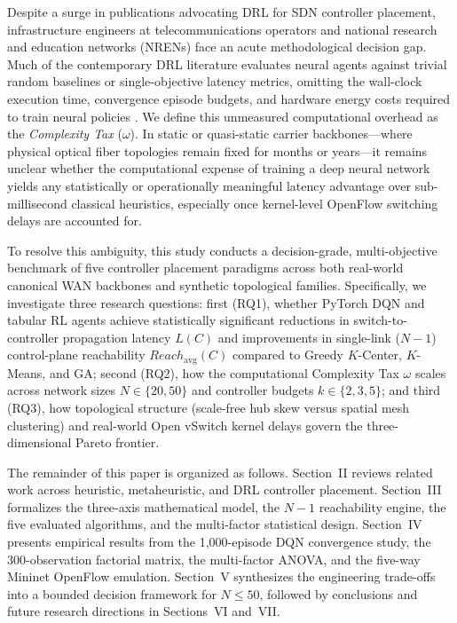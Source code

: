 \documentclass[conference]{IEEEtran}
\begin{document}
Despite a surge in publications advocating DRL for SDN controller placement, infrastructure engineers at telecommunications operators and national research and education networks (NRENs) face an acute methodological decision gap. Much of the contemporary DRL literature evaluates neural agents against trivial random baselines or single-objective latency metrics, omitting the wall-clock execution time, convergence episode budgets, and hardware energy costs required to train neural policies \cite{benoudifa2023, kurra2025, farahi2026}. We define this unmeasured computational overhead as the \textit{Complexity Tax} ($\omega$). In static or quasi-static carrier backbones---where physical optical fiber topologies remain fixed for months or years---it remains unclear whether the computational expense of training a deep neural network yields any statistically or operationally meaningful latency advantage over sub-millisecond classical heuristics, especially once kernel-level OpenFlow switching delays are accounted for.

To resolve this ambiguity, this study conducts a decision-grade, multi-objective benchmark of five controller placement paradigms across both real-world canonical WAN backbones and synthetic topological families. Specifically, we investigate three research questions: first (RQ1), whether PyTorch DQN and tabular RL agents achieve statistically significant reductions in switch-to-controller propagation latency $L(C)$ and improvements in single-link ($N-1$) control-plane reachability $Reach_{\text{avg}}(C)$ compared to Greedy $K$-Center, $K$-Means, and GA; second (RQ2), how the computational Complexity Tax $\omega$ scales across network sizes $N \in \{20, 50\}$ and controller budgets $k \in \{2, 3, 5\}$; and third (RQ3), how topological structure (scale-free hub skew versus spatial mesh clustering) and real-world Open vSwitch kernel delays govern the three-dimensional Pareto frontier.

The remainder of this paper is organized as follows. Section~II reviews related work across heuristic, metaheuristic, and DRL controller placement. Section~III formalizes the three-axis mathematical model, the $N-1$ reachability engine, the five evaluated algorithms, and the multi-factor statistical design. Section~IV presents empirical results from the 1,000-episode DQN convergence study, the 300-observation factorial matrix, the multi-factor ANOVA, and the five-way Mininet OpenFlow emulation. Section~V synthesizes the engineering trade-offs into a bounded decision framework for $N \le 50$, followed by conclusions and future research directions in Sections~VI and~VII.
\end{document}
